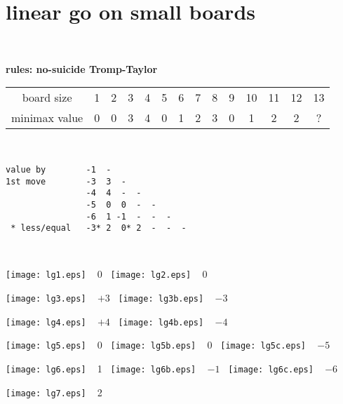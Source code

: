 \documentclass[12pt]{article}
\begin{document}
\section*{linear go on small boards}
\vfill~

\noindent
{\large\bf rules: no-suicide Tromp-Taylor}\hfill~
\vfill

\noindent
{\large 
\begin{tabular}{cccccccccccccc}
board size  & 1 & 2 & 3 & 4 & 5 & 6 & 7 & 8 & 9 & 10 & 11 & 12 & 13 \\
minimax value & 0 & 0 & 3 & 4 & 0 & 1 & 2 & 3 & 0 & 1 & 2 & 2 & ? \\
\end{tabular}
}
\vfill~

\begin{verbatim}
value by        -1  - 
1st move        -3  3  -
                -4  4  -  -
                -5  0  0  -  -
                -6  1 -1  -  -  -
 * less/equal   -3* 2  0* 2  -  -  - 
\end{verbatim}
\vfill

\vfill~

\hfill\texttt{[image: lg1.eps]} ~ 0\hfill~
\hfill\texttt{[image: lg2.eps]} ~ 0\hfill~
\vfill

\hfill\texttt{[image: lg3.eps]} ~ $+3$\hfill~
\hfill\texttt{[image: lg3b.eps]} ~ $-3$\hfill~
\vfill

\hfill\texttt{[image: lg4.eps]} ~ $+4$\hfill~
\hfill\texttt{[image: lg4b.eps]} ~ $-4$\hfill~
\vfill

\hfill\texttt{[image: lg5.eps]} ~ 0\hfill~
\hfill\texttt{[image: lg5b.eps]} ~ 0\hfill~
\hfill\texttt{[image: lg5c.eps]} ~ $-5$\hfill~
\vfill

\hfill\texttt{[image: lg6.eps]} ~ 1\hfill~
\hfill\texttt{[image: lg6b.eps]} ~ $-1$\hfill~
\hfill\texttt{[image: lg6c.eps]} ~ $-6$\hfill~
\vfill~

\hfill\texttt{[image: lg7.eps]} ~ 2\hfill~
\vfill~
\end{document}
